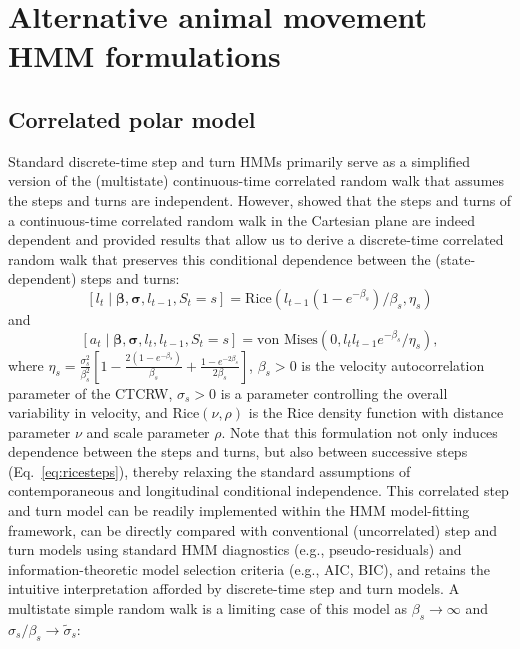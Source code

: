 \documentclass[12pt]{article}\usepackage[]{graphicx}\usepackage[]{xcolor}
\begin{document}
\section{Alternative animal movement HMM formulations}

\subsection{Correlated polar model}
Standard discrete-time step and turn HMMs primarily serve as a simplified version of the (multistate) continuous-time correlated random walk \citep[CTCRW, e.g.,][]{JohnsonEtAl2008,MichelotBlackwell2018} that assumes the steps and turns are independent. However, \citet{McClintockEtAl2014b} showed that the steps and turns of a continuous-time correlated random walk in the Cartesian plane are indeed dependent and provided results \citep[based on][Chapter 7]{kobayashi2011probability} that allow us to derive a discrete-time correlated random walk that preserves this conditional dependence between the (state-dependent) steps and turns:
\begin{equation}
\label{eq:ricesteps}
  [l_t \mid \boldsymbol{\beta}, \boldsymbol{\sigma}, l_{t-1}, S_t = s] = \text{Rice}\left(l_{t-1}\left(1-e^{-\beta_s}\right) / \beta_s, \eta_s \right)
\end{equation}
and
\begin{equation}
\label{eq:vmangles}
  [a_t \mid \boldsymbol{\beta}, \boldsymbol{\sigma}, l_t, l_{t-1}, S_t = s] = \text{von Mises}\left(0, l_t l_{t-1} e^{-\beta_s} / \eta_s \right),
\end{equation}
where $\eta_s = \frac{\sigma_s^2}{\beta_s^2} \left[1-\frac{2 \left(1-e^{-\beta_s}\right)}{\beta_s}+\frac{1-e^{-2\beta_s}}{2 \beta_s} \right]$, $\beta_s>0$ is the velocity autocorrelation parameter of the CTCRW, $\sigma_s>0$ is a parameter controlling the overall variability in velocity, and $\text{Rice}\left(\nu, \rho \right)$ is the Rice density function with distance parameter $\nu$ and scale parameter $\rho$. Note that this formulation not only induces dependence between the steps and turns, but also between successive steps (Eq.\ \ref{eq:ricesteps}), thereby relaxing the standard assumptions of contemporaneous and longitudinal conditional independence. %
This correlated step and turn model can be readily implemented within the HMM model-fitting framework, can be directly compared with conventional (uncorrelated) step and turn models using standard HMM diagnostics (e.g., pseudo-residuals) and information-theoretic model selection criteria (e.g., AIC, BIC), and retains the intuitive interpretation afforded by discrete-time step and turn models. A multistate simple random walk is a limiting case of this model as $\beta_s \to \infty$ and  $\sigma_s/\beta_s \to \tilde{\sigma}_s$:
\end{document}
